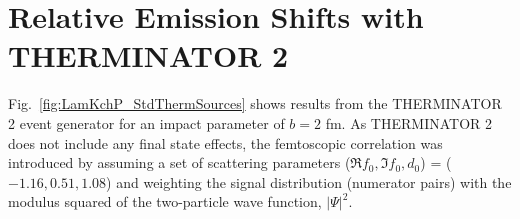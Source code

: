 \documentclass[ALICE,manyauthors]{cernphprep}
\newcommand{\ResultsDirBase}{/home/jesse/Analysis/FemtoAnalysis/Results/}
\newcommand{\Lam}{$\Lambda$\xspace}
\newcommand{\LamKchP}{$\Lambda\mathrm{K^{+}}$\xspace}
\begin{document}
\begin{comment}
\section{Spherical Harmonic Decomposition}
\label{app:SphericalHarmonics}


In Fig.\ \ref{fig:LamKchP_ReC00C11_0010} results are shown for the $C_{00}$ and $\Re C_{11}$ components from the spherical decomposition of our \LamKchP system in the 0--10\% centrality bin.
As seen in the figure, the $C_{00}$ signal is similar to that observed in the one-dimensional study.
The $\Re C_{11}$ component shows a clear deviation from zero, and the negative value signifies that the \Lam particles are, on average, emitted further out and/or earlier than the K mesons.


\begin{figure}[h!]
  \centering
  \texttt{[image: \\ResultsDirBase Results\_cLamcKch\_20181205/SphericalHarmonics/LamKchP/CanCfYlmReC00C11\_LamKchPALamKchM\_0010.pdf]}
  \caption[\LamKchP $C_{00}$ and $\Re C_{11}$ Spherical Harmonic Components (0--10\%)]{$C_{00}$ (left) and $\Re C_{11}$ (right) components of a spherical harmonic decomposition of the \LamKchP correlation function for the 0--10\% centrality bin.  
The $C_{00}$ component is similar to the 1D correlation functions typically studied, and probes the overall size of the source.
The $\Re C_{11}$ component probes the asymmetry in the system; a non-zero value reveals the asymmetry}
  \label{fig:LamKchP_ReC00C11_0010}
\end{figure}
\end{comment}

\section{Relative Emission Shifts with THERMINATOR 2}
\label{App:THERM}

Fig.\ \ref{fig:LamKchP_StdThermSources} shows results from the THERMINATOR 2 event generator for an impact parameter of $b = 2$ fm.
As THERMINATOR 2 does not include any final state effects, the femtoscopic correlation was introduced by assuming a set of scattering parameters ($\Re f_{0}, \Im f_{0}, d_{0}$) = ($-1.16, 0.51, 1.08$) and weighting the signal distribution (numerator pairs) with the modulus squared of the two-particle wave function, $|\Psi|^{2}$.
\end{document}
